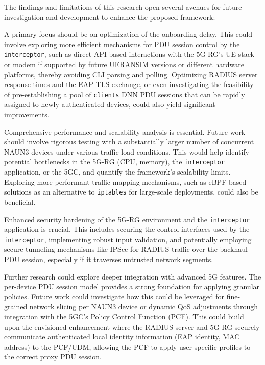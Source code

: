The findings and limitations of this research open several avenues for future investigation and development to enhance the proposed framework:

A primary focus should be on optimization of the onboarding delay. This could involve exploring more efficient mechanisms for \ac{PDU} session control by the \texttt{interceptor}, such as direct \ac{API}-based interactions with the \ac{5G-RG}'s \ac{UE} stack or modem if supported by future UERANSIM versions or different hardware platforms, thereby avoiding \ac{CLI} parsing and polling. Optimizing \ac{RADIUS} server response times and the \ac{EAP-TLS} exchange, or even investigating the feasibility of pre-establishing a pool of \texttt{clients} \ac{DNN} \ac{PDU} sessions that can be rapidly assigned to newly authenticated devices, could also yield significant improvements.

Comprehensive performance and scalability analysis is essential. Future work should involve rigorous testing with a substantially larger number of concurrent \ac{NAUN3} devices under various traffic load conditions. This would help identify potential bottlenecks in the \ac{5G-RG} (\ac{CPU}, memory), the \texttt{interceptor} application, or the \ac{5GC}, and quantify the framework's scalability limits. Exploring more performant traffic mapping mechanisms, such as \ac{eBPF}-based solutions as an alternative to \texttt{iptables} for large-scale deployments, could also be beneficial.

Enhanced security hardening of the \ac{5G-RG} environment and the \texttt{interceptor} application is crucial. This includes securing the control interfaces used by the \texttt{interceptor}, implementing robust input validation, and potentially employing secure tunneling mechanisms like \ac{IPSec} for \ac{RADIUS} traffic over the backhaul \ac{PDU} session, especially if it traverses untrusted network segments.

Further research could explore deeper integration with advanced \ac{5G} features. The per-device \ac{PDU} session model provides a strong foundation for applying granular policies. Future work could investigate how this could be leveraged for fine-grained network slicing per \ac{NAUN3} device or dynamic \ac{QoS} adjustments through integration with the \ac{5GC}'s Policy Control Function (\ac{PCF}). This could build upon the envisioned enhancement where the \ac{RADIUS} server and \ac{5G-RG} securely communicate authenticated local identity information (\ac{EAP} identity, \ac{MAC} address) to the \ac{PCF}/\ac{UDM}, allowing the \ac{PCF} to apply user-specific profiles to the correct proxy \ac{PDU} session.

